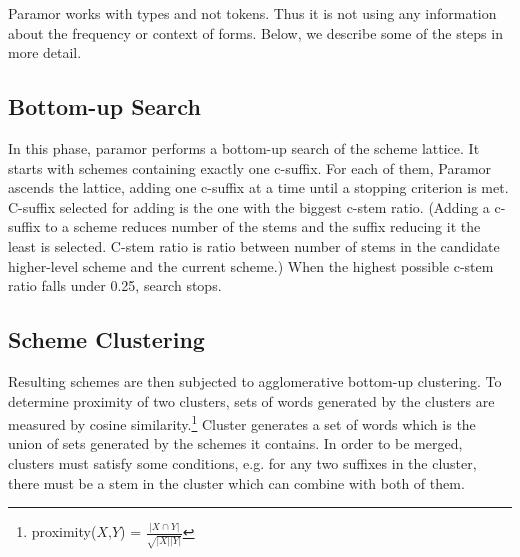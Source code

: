 \documentclass[11pt]{article}
\begin{document}
\noindent
Paramor works with types and not tokens. Thus it is not using any information about the frequency or context of forms.
%
Below, we describe some of the steps in more detail.




%

\subsection{Bottom-up Search}

\noindent
In this phase, paramor performs a bottom-up search of the scheme lattice. It starts with schemes containing exactly one c-suffix. For each of them, Paramor ascends the lattice, adding one c-suffix at a time until a stopping criterion is met. C-suffix selected for adding is the one with the biggest c-stem ratio. (Adding a c-suffix to a scheme reduces number of the stems and the suffix reducing it the least is selected. C-stem ratio is ratio between number of stems in the candidate higher-level scheme and the current scheme.) When the highest possible c-stem ratio falls under 0.25, search stops.

\subsection{Scheme Clustering}

\noindent
Resulting schemes are then subjected to agglomerative bottom-up clustering. To determine proximity of two clusters, sets of words generated by the clusters are measured by cosine similarity.\footnote{proximity($X$,$Y$) = $\frac{|X \cap Y|}{\sqrt{|X||Y|}}$} Cluster generates a set of words which is the union of sets generated by the schemes it contains. In order to be merged, clusters must satisfy some conditions, e.g. for any two suffixes in the cluster, there must be a stem in the cluster which can combine with both of them.
\end{document}
